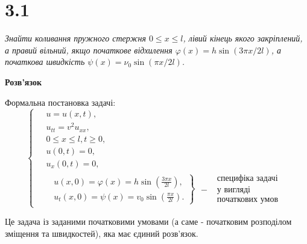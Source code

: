 

%


\section[Задача №3.1]{3.1}

\textit{Знайти коливання пружного стержня $0 \leq x \leq l$, лівий кінець якого закріплений, а правий вільний, якщо початкове відхилення $\varphi(x) = h \sin(3\pi x/2l)$, а початкова швидкість $\psi(x) = \nu_0 \sin(\pi x/2l)$.}

\begin{center}
    \textbf{Розв'язок}
\end{center}
Формальна постановка задачі:
\begin{equation} \label{probcond4}
    \left\{ \begin{aligned} %
        &\;u = u(x,t), \\
        &\;u_{tt} = v^2 u_{xx}, \\
        &\;0 \leq x \leq l, t \geq 0, \\
        &\;u(0,t) = 0,\\
        &\;u_x(0,t) = 0,\\
        &\left.\begin{aligned}
            &u(x,0) = \varphi(x) = h \sin \left(\frac{3 \pi x}{2 l} \right), \\ 
            &u_t(x,0) = \psi(x) = v_0 \sin \left(\frac{\pi x}{2 l}\right).
        \end{aligned}\right\} \; 
        \begin{aligned}
            &\text{ специфіка задачі} \\
          - &\text{ у вигляді } \\
            &\text{ початкових умов } 
        \end{aligned}
    \end{aligned} \right.
\end{equation}

Це задача із заданими початковими умовами (а саме - початковим розподілом зміщення та швидкостей), яка має єдиний розв'язок.

